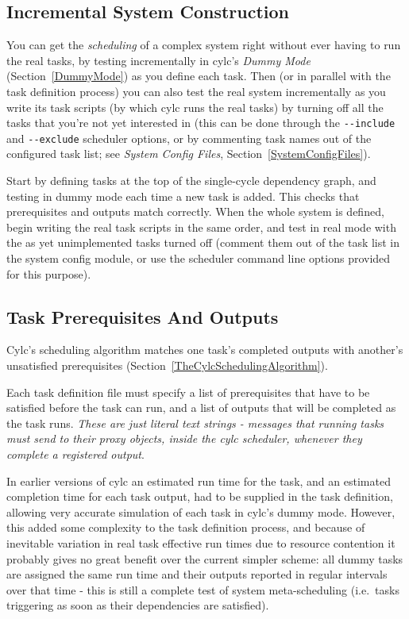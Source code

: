 \documentclass[11pt,a4paper]{article}
\begin{document}
\subsection{Incremental System Construction} 
\label{IncrementalSystemConstruction}

You can get the {\em scheduling} of a complex system right without ever
having to run the real tasks, by testing incrementally in cylc's {\em
Dummy Mode} (Section~\ref{DummyMode}) as you define each task. Then (or
in parallel with the task definition process) you can also test the real
system incrementally as you write its task scripts (by which cylc runs
the real tasks) by turning off all the tasks that you're not yet
interested in (this can be done through the \lstinline=--include= and
\lstinline=--exclude= scheduler options, or by commenting task names out
of the configured task list; see {\em System Config Files},
Section~\ref{SystemConfigFiles}).

Start by defining tasks at the top of the single-cycle dependency graph,
and testing in dummy mode each time a new task is added. This checks
that prerequisites and outputs match correctly. When the whole system is
defined, begin writing the real task scripts in the same order, and test
in real mode with the as yet unimplemented tasks turned off (comment
them out of the task list in the system config module, or use the
scheduler command line options provided for this purpose). 


\subsection{Task Prerequisites And Outputs}
\label{TaskPrerequisitesAndOutputs}

Cylc's scheduling algorithm matches one task's completed outputs with
another's unsatisfied prerequisites
(Section~\ref{TheCylcSchedulingAlgorithm}).  

Each task definition file must specify a list of prerequisites that have
to be satisfied before the task can run, and a list of outputs that will
be completed as the task runs. {\em These are just literal text
strings - messages that running tasks must send to their proxy objects,
inside the cylc scheduler, whenever they complete a registered output}.

In earlier versions of cylc an estimated run time for the task, and an
estimated completion time for each task output, had to be supplied in
the task definition, allowing very accurate simulation of each task
in cylc's dummy mode.  However, this added some complexity to the task
definition process, and because of inevitable variation in real task
effective run times due to resource contention it probably gives no
great benefit over the current simpler scheme: all dummy tasks are
assigned the same run time and their outputs reported in regular
intervals over that time - this is still a complete test of system
meta-scheduling (i.e.\ tasks triggering as soon as their dependencies
are satisfied). 
\end{document}
